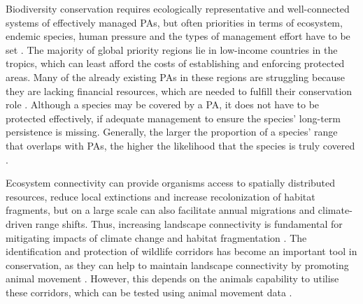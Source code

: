 \documentclass[12pt,a4paper, twoside, english]{article}
\begin{document}

Biodiversity conservation requires ecologically representative and well-connected systems of effectively managed PAs, but often priorities in terms of ecosystem, endemic species, human pressure and the types of management effort have to be set \citep{Dewi2013}. The majority of global priority regions lie in low-income countries in the tropics, which can least afford the costs of establishing and enforcing protected areas. Many of the already existing PAs in these regions are struggling because they are lacking financial resources, which are needed to fulfill their conservation role \citep{Rodrigues2004}. Although a species may be covered by a PA, it does not have to be protected effectively, if adequate management to ensure the species’ long-term persistence is missing. Generally, the larger the proportion of a species’ range that overlaps with PAs, the higher the likelihood that the species is truly covered \citep{Rodrigues2004}.


Ecosystem connectivity can provide organisms access to spatially distributed resources, reduce local extinctions and increase recolonization of habitat fragments, but on a large scale can also facilitate annual migrations and climate-driven range shifts. Thus, increasing landscape connectivity is fundamental for mitigating impacts of climate change and habitat fragmentation \citep{Rayfield2016, Abrahms2016}. The identification and protection of wildlife corridors has become an important tool in conservation, as they can help to maintain landscape connectivity by promoting animal movement \citep{Gilbert-Norton2010}. However, this depends on the animals capability to utilise these corridors, which can be tested using animal movement data \citep{LaPoint2013}.

\end{document}
